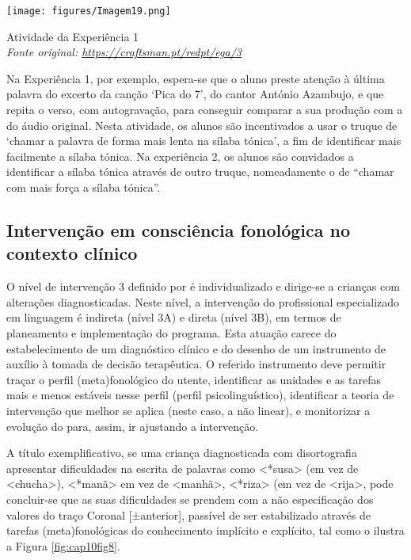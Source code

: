 \documentclass[output=paper,colorlinks,citecolor=brown,booklanguage=portuguese]{langscibook}
\begin{document}
\begin{Figura}
    \centering
    \texttt{[image: figures/Imagem19.png]}



    \caption{{Atividade da Experiência 1}\\ \emph{\small{Fonte original: \url{https://craftsman.pt/redpt/ega/3}}}}
    \label{fig:cap10fig7}
\end{Figura}


Na Experiência 1, por exemplo, espera-se que o aluno preste atenção à última palavra do excerto da canção ‘Pica do 7’, do cantor António Azambujo, e que repita o verso, com autogravação, para conseguir comparar a sua produção com a do áudio original. Nesta atividade, os alunos são incentivados a usar o truque de ‘chamar a palavra de forma mais lenta na sílaba tónica’, a fim de identificar mais facilmente a sílaba tónica. Na experiência 2, os alunos são convidados a identificar a sílaba tónica através de outro truque, nomeadamente o de “chamar com mais força a sílaba tónica”.

\subsection{Intervenção em consciência fonológica no contexto clínico}
O nível de intervenção 3 definido por \citet{Ebbels2017} é individualizado e diri\-ge-se a crianças com alterações diagnosticadas. Neste nível, a intervenção do profissional especializado em linguagem é indireta (nível 3A) e direta (nível 3B), em termos de planeamento e implementação do programa. Esta atuação carece do estabelecimento de um diagnóstico clínico e do desenho de um instrumento de auxílio à tomada de decisão terapêutica. O referido instrumento deve permitir traçar o perfil (meta)fonológico do utente, identificar as unidades e as tarefas mais e menos estáveis nesse perfil (perfil psicolinguístico), identificar a teoria de intervenção que melhor se aplica (neste caso, a não linear), e monitorizar a evolução do para, assim, ir ajustando a intervenção. 

A título exemplificativo, se uma criança diagnosticada com disortografia apresentar dificuldades na escrita de palavras como <*susa> (em vez de <chucha>), <*manã> em vez de <manhã>, <*riza> (em vez de <rija>, pode concluir-se que as suas dificuldades se prendem com a não especificação dos valores do traço Coronal [±anterior], passível de ser estabilizado através de tarefas (meta)fonológicas do conhecimento implícito e explícito, tal como o ilustra a Figura \ref{fig:cap10fig8}.
\end{document}

